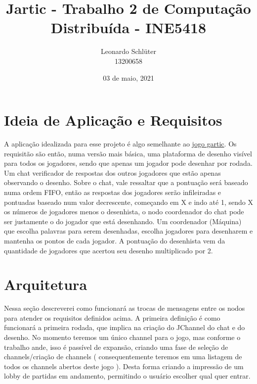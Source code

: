 \documentclass{article}
\title{Jartic - Trabalho 2 de Computação Distribuída - INE5418}
\author{Leonardo Schlüter \\ 13200658}
\date{03 de maio, 2021}
\begin{document}
\maketitle

\section{Ideia de Aplicação e Requisitos}

A aplicação idealizada para esse projeto é algo semelhante ao \href{https://gartic.com.br/}{jogo gartic}. Os requisitão são então, numa versão mais básica, uma plataforma de desenho visível para todos os jogadores, sendo que apenas um jogador pode desenhar por rodada. Um chat verificador de respostas dos outros jogadores que estão apenas observando o desenho. Sobre o chat, vale ressaltar que a pontuação será baseado numa ordem FIFO, então as respostas dos jogadores serão infileiradas e pontuadas baseado num valor decrescente, começando em X e indo até 1, sendo X os números de jogadores menos o desenhista, o nodo coordenador do chat pode ser justamente o do jogador que está desenhando. Um coordenador (Máquina) que escolha palavras para serem desenhadas, escolha jogadores para desenharem e mantenha os pontos de cada jogador. A pontuação do desenhista vem da quantidade de jogadores que acertou seu desenho multiplicado por 2. 

\section{Arquitetura}


Nessa seção descreverei como funcionará as trocas de mensagens entre os nodos para atender os requisitos definidos acima. A primeira definição é como funcionará a primeira rodada, que implica na criação do JChannel do chat e do desenho. No momento teremos um único channel para o jogo, mas conforme o trabalho ande, isso é passível de expansão, criando uma fase de seleção de channels/criação de channels ( consequentemente teremos em uma listagem de todos os channels abertos deste jogo ). Desta forma criando a impressão de um lobby de partidas em andamento, permitindo o usuário escolher qual quer entrar.
\end{document}
